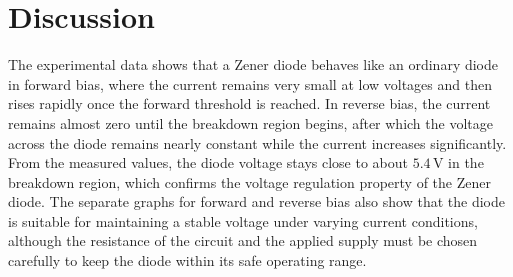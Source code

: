 \section{Discussion}

The experimental data shows that a Zener diode behaves like an ordinary diode in forward bias, where the current remains very small at low voltages and then rises rapidly once the forward threshold is reached. In reverse bias, the current remains almost zero until the breakdown region begins, after which the voltage across the diode remains nearly constant while the current increases significantly. From the measured values, the diode voltage stays close to about $5.4\,\text{V}$ in the breakdown region, which confirms the voltage regulation property of the Zener diode. The separate graphs for forward and reverse bias also show that the diode is suitable for maintaining a stable voltage under varying current conditions, although the resistance of the circuit and the applied supply must be chosen carefully to keep the diode within its safe operating range.



